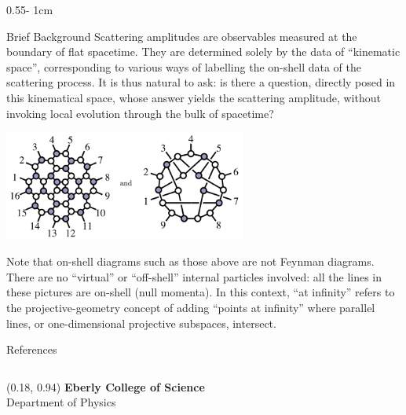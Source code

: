 \documentclass{../psuposter}
\begin{document}
\begin{frame}
\begin{columns}
\begin{column}{0.55\textwidth - 1cm}
    \begin{block}{Brief Background}
        Scattering amplitudes are observables measured at the boundary of flat spacetime. They are determined solely by the data of “kinematic space”, corresponding to various ways of labelling the on-shell data of the scattering process. It is thus natural to ask: is there a question, directly posed in this kinematical space, whose answer yields the scattering amplitude, without invoking local evolution through the bulk of spacetime? \cite{arkani-hamedCausalDiamondsCluster2020}
        \begin{center}
	    	\includegraphics[width=0.6\textwidth]{images/on-shell}    		
    	\end{center}
		Note that on-shell diagrams such as those above are not Feynman diagrams. There are no “virtual” or “off-shell” internal particles involved: all the lines in these pictures are on-shell (null momenta).  
		In this context, ``at infinity'' refers to the projective-geometry concept of adding ``points at infinity'' where parallel lines, or one-dimensional projective subspaces, intersect.
        \cite{naberTopologyGeometryGauge2011b}
    \end{block}


    \begin{block}{References}
        
		
    \end{block}

\end{column}
\end{columns}


\begin{textblock}{0.5}(0.18, 0.94)
    \color{white}
    \sffamily
    \textbf{Eberly College of Science}
    \\
    Department of Physics
\end{textblock}


\end{frame}
\end{document}
